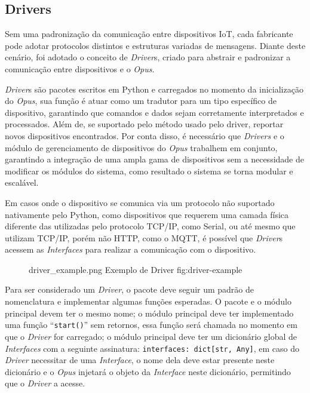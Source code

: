 \subsection{Drivers}

Sem uma padronização da comunicação entre dispositivos IoT, cada fabricante pode adotar protocolos distintos e estruturas variadas de 
mensagens. Diante deste cenário, foi adotado o conceito de \emph{Driver}s, criado para abstrair e padronizar a comunicação entre 
dispositivos e o \emph{Opus}.

\emph{Driver}s são pacotes escritos em Python e carregados no momento da inicialização do \emph{Opus},
sua função é atuar como um tradutor para um tipo específico de dispositivo, garantindo que 
comandos e dados sejam corretamente interpretados e processados. Além de, se suportado pelo método usado pelo driver, reportar
novos dispositivos encontrados. Por conta disso, é necessário que \emph{Drivers} e o módulo de gerenciamento de dispositivos do 
\emph{Opus} trabalhem em conjunto, garantindo a integração de uma ampla gama de dispositivos 
sem a necessidade de modificar os módulos do sistema, como resultado o sistema se torna modular e escalável.

Em casos onde o dispositivo se comunica via um protocolo não suportado nativamente pelo Python, como dispositivos que 
requerem uma camada física diferente das utilizadas pelo protocolo TCP/IP, como Serial, ou até mesmo que utilizam TCP/IP, 
porém não HTTP, como o MQTT, é possível que \emph{Driver}s acessem as \emph{Interfaces} para realizar a comunicação com o dispositivo.

\begin{figure}[h!]
    {driver_example.png}
    {Exemplo de Driver}
    {fig:driver-example}
\end{figure}

Para ser considerado um \emph{Driver}, o pacote deve seguir um padrão de nomenclatura e implementar algumas funções esperadas.
O pacote e o módulo principal devem ter o mesmo nome; o módulo principal deve ter implementado uma função ``\lstinline{start()}'' sem retornos,
essa função será chamada no momento em que o \emph{Driver} for carregado; o módulo principal deve ter um dicionário global de 
\emph{Interfaces} com a seguinte assinatura: \lstinline{interfaces: dict[str, Any]}, em caso do \emph{Driver} necessitar de uma \emph{Interface},
o nome dela deve estar presente neste dicionário e o \emph{Opus} injetará o objeto da \emph{Interface} neste dicionário,
permitindo que o \emph{Driver} a acesse.

